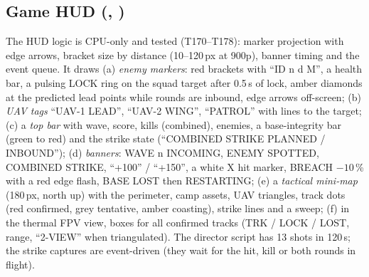 \subsection{Game HUD (, )}
The HUD logic is CPU-only and tested (T170--T178): marker projection with edge arrows, bracket size by distance (10--120\,px at 900p), banner timing and the event queue. It draws (a) \emph{enemy markers}: red brackets with ``ID n  d M'', a health bar, a pulsing LOCK ring on the squad target after 0.5\,s of lock, amber diamonds at the predicted lead points while rounds are inbound, edge arrows off-screen;
(b) \emph{UAV tags} ``UAV-1 LEAD'', ``UAV-2 WING'', ``PATROL'' with lines to the target; (c) a \emph{top bar} with wave, score, kills (combined), enemies, a base-integrity bar (green to red) and the strike state
(``COMBINED STRIKE PLANNED / INBOUND''); (d) \emph{banners}: WAVE n INCOMING, ENEMY SPOTTED, COMBINED STRIKE, ``+100'' / ``+150'', a white X hit marker, BREACH $-10$\,\% with a red edge flash, BASE LOST then RESTARTING; (e) a \emph{tactical mini-map}
(180\,px, north up) with the perimeter, camp assets, UAV triangles, track dots (red confirmed, grey tentative, amber coasting), strike lines and a sweep; (f) in the thermal FPV view, boxes for all confirmed tracks (TRK / LOCK / LOST, range,
``2-VIEW'' when triangulated). The director script has 13 shots in 120\,s; the strike captures are event-driven (they wait for the hit, kill or both rounds in flight).


